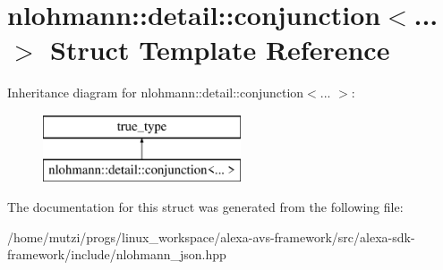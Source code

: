 \hypertarget{structnlohmann_1_1detail_1_1conjunction}{}\section{nlohmann\+:\+:detail\+:\+:conjunction$<$... $>$ Struct Template Reference}
\label{structnlohmann_1_1detail_1_1conjunction}
Inheritance diagram for nlohmann\+:\+:detail\+:\+:conjunction$<$... $>$\+:\begin{figure}[H]
\begin{center}
\leavevmode
\includegraphics[height=2.000000cm]{dd/dde/structnlohmann_1_1detail_1_1conjunction}
\end{center}
\end{figure}


The documentation for this struct was generated from the following file\+:\begin{DoxyCompactItemize}
\item 
/home/mutzi/progs/linux\+\_\+workspace/alexa-\/avs-\/framework/src/alexa-\/sdk-\/framework/include/nlohmann\+\_\+json.\+hpp\end{DoxyCompactItemize}
